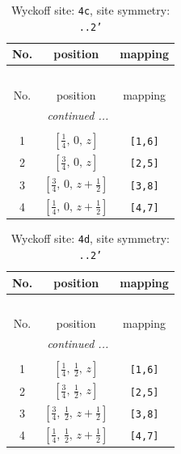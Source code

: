 \documentclass[fleqn,8pt]{jsarticle}
\begin{document}
\renewcommand{\arraystretch}{1.2}
\begin{longtable}{ccc}
\caption{Wyckoff site: {\tt 4c}, site symmetry: {\tt ..2'}}
 \\
 \hline \hline
No. & position & mapping \\ \hline \endfirsthead

\multicolumn{2}{l}{\tablename\ \thetable{}} \\
 \hline \hline
No. & position & mapping \\ \hline \endhead

 \hline \hline
\multicolumn{2}{r}{\footnotesize\it continued ...} \\ \endfoot

 \hline \hline
\multicolumn{2}{r}{} \\ \endlastfoot

1 & $\left[ \frac{1}{4},\, 0,\, z \right]$ & {\tt [1,6]} \\ \hline
2 & $\left[ \frac{3}{4},\, 0,\, z \right]$ & {\tt [2,5]} \\ \hline
3 & $\left[ \frac{3}{4},\, 0,\, z + \frac{1}{2} \right]$ & {\tt [3,8]} \\ \hline
4 & $\left[ \frac{1}{4},\, 0,\, z + \frac{1}{2} \right]$ & {\tt [4,7]} \\
\end{longtable}
\renewcommand{\arraystretch}{1.2}
\begin{longtable}{ccc}
\caption{Wyckoff site: {\tt 4d}, site symmetry: {\tt ..2'}}
 \\
 \hline \hline
No. & position & mapping \\ \hline \endfirsthead

\multicolumn{2}{l}{\tablename\ \thetable{}} \\
 \hline \hline
No. & position & mapping \\ \hline \endhead

 \hline \hline
\multicolumn{2}{r}{\footnotesize\it continued ...} \\ \endfoot

 \hline \hline
\multicolumn{2}{r}{} \\ \endlastfoot

1 & $\left[ \frac{1}{4},\, \frac{1}{2},\, z \right]$ & {\tt [1,6]} \\ \hline
2 & $\left[ \frac{3}{4},\, \frac{1}{2},\, z \right]$ & {\tt [2,5]} \\ \hline
3 & $\left[ \frac{3}{4},\, \frac{1}{2},\, z + \frac{1}{2} \right]$ & {\tt [3,8]} \\ \hline
4 & $\left[ \frac{1}{4},\, \frac{1}{2},\, z + \frac{1}{2} \right]$ & {\tt [4,7]} \\
\end{longtable}
\end{document}
